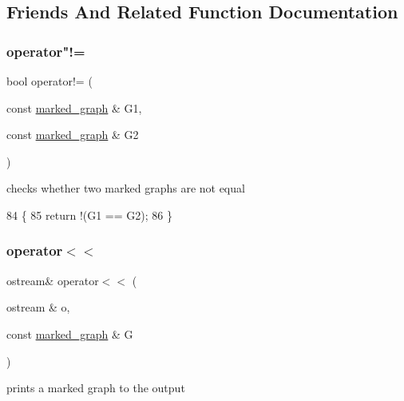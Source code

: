 \subsection{Friends And Related Function Documentation}
\mbox{\label{classmarked__graph_a52ab641f19231908b18f8661bad17493}} 
\subsubsection{\texorpdfstring{operator"!=}{operator!=}}
{\footnotesize\ttfamily bool operator!= (\begin{DoxyParamCaption}\item[{const \hyperlink{classmarked__graph}{marked\+\_\+graph} \&}]{G1,  }\item[{const \hyperlink{classmarked__graph}{marked\+\_\+graph} \&}]{G2 }\end{DoxyParamCaption})\hspace{0.3cm}{\ttfamily [friend]}}



checks whether two marked graphs are not equal 


\begin{DoxyCode}
84 \{
85   \textcolor{keywordflow}{return} !(G1 == G2);
86 \}
\end{DoxyCode}
\mbox{\label{classmarked__graph_a4f98d2df29f50f6da1365a14fd80d764}} 
\subsubsection{\texorpdfstring{operator$<$$<$}{operator<<}}
{\footnotesize\ttfamily ostream\& operator$<$$<$ (\begin{DoxyParamCaption}\item[{ostream \&}]{o,  }\item[{const \hyperlink{classmarked__graph}{marked\+\_\+graph} \&}]{G }\end{DoxyParamCaption})\hspace{0.3cm}{\ttfamily [friend]}}



prints a marked graph to the output 


